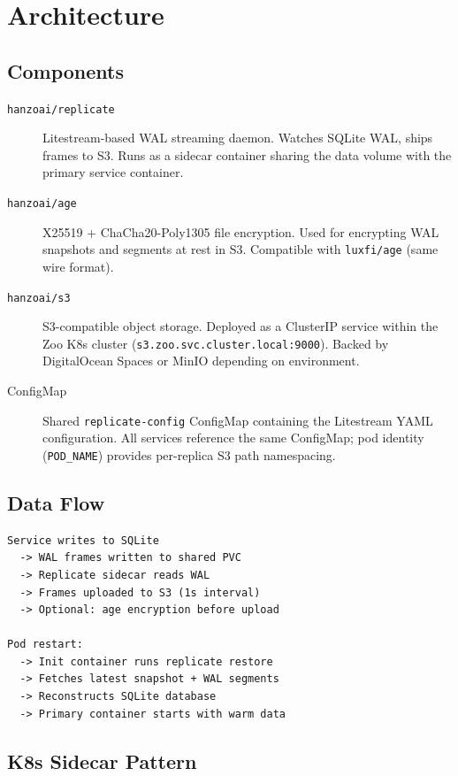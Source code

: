 \section{Architecture}


\subsection{Components}

\begin{description}
\item[\texttt{hanzoai/replicate}] Litestream-based WAL streaming
  daemon.  Watches SQLite WAL, ships frames to S3.  Runs as a
  sidecar container sharing the data volume with the primary
  service container.

\item[\texttt{hanzoai/age}] X25519 + ChaCha20-Poly1305 file
  encryption.  Used for encrypting WAL snapshots and segments
  at rest in S3.  Compatible with \texttt{luxfi/age} (same
  wire format).

\item[\texttt{hanzoai/s3}] S3-compatible object storage.  Deployed
  as a ClusterIP service within the Zoo K8s cluster
  (\texttt{s3.zoo.svc.cluster.local:9000}).  Backed by
  DigitalOcean Spaces or MinIO depending on environment.

\item[ConfigMap] Shared \texttt{replicate-config} ConfigMap
  containing the Litestream YAML configuration.  All services
  reference the same ConfigMap; pod identity (\texttt{POD\_NAME})
  provides per-replica S3 path namespacing.
\end{description}

\subsection{Data Flow}

\begin{verbatim}
Service writes to SQLite
  -> WAL frames written to shared PVC
  -> Replicate sidecar reads WAL
  -> Frames uploaded to S3 (1s interval)
  -> Optional: age encryption before upload

Pod restart:
  -> Init container runs replicate restore
  -> Fetches latest snapshot + WAL segments
  -> Reconstructs SQLite database
  -> Primary container starts with warm data
\end{verbatim}

\subsection{K8s Sidecar Pattern}

